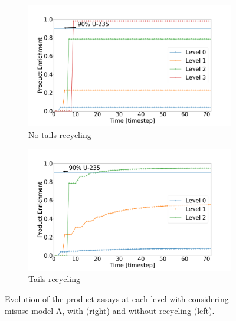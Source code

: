 \begin{figure}[h!]
    \centering
    \begin{subfigure}[t]{0.45\textwidth}
        \centering
        \includegraphics[scale=0.17]{NR_case1}
        \caption{No tails recycling}
        \label{sfig:case1_NR}
    \end{subfigure}%
    \begin{subfigure}[t]{0.45\textwidth}
        \centering
        \includegraphics[scale=0.17]{R_case1}
        \caption{Tails recycling}
        \label{sfig:case1_R}
    \end{subfigure}
    \caption{Evolution of the product assays at each level with considering
    misuse model A, with (right) and without recycling (left).}
    \label{fig:case1}
\end{figure}



